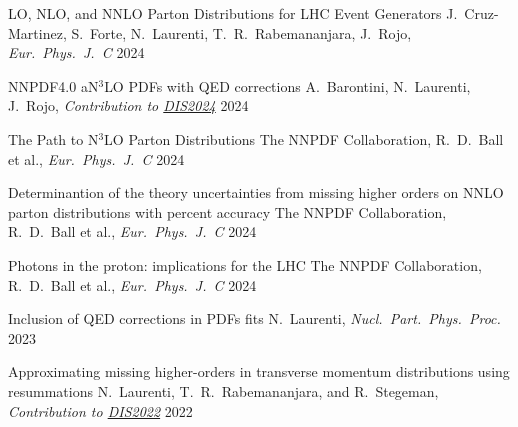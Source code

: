 
\begin{cvhonors}


    \cvhonor
    {LO, NLO, and NNLO Parton Distributions for LHC Event Generators} %
    {J.~Cruz-Martinez, S.~Forte, N.~Laurenti, T.~R.~Rabemananjara, J.~Rojo, \emph{Eur.\ Phys.\ J.\ C}} %
    {\vspace{0.35cm}\href{https://inspirehep.net/literature/2800507}{}}
    {\vspace{0.35cm}2024}

    \cvhonor
    {NNPDF4.0 aN$^3$LO PDFs with QED corrections} %
    {A.~Barontini, N.~Laurenti, J.~Rojo, \emph{Contribution to \href{https://inspirehep.net/conferences/2667502?ui-citation-summary=true}{DIS2024}}} %
    {\href{https://inspirehep.net/literature/2794583}{}}
    {2024}
    
    \cvhonor
    {The Path to N$^3$LO Parton Distributions} %
    {The NNPDF Collaboration, R.~D.~Ball et al., \emph{Eur.\ Phys.\ J.\ C}} %
    {\href{https://inspirehep.net/literature/2762925}{}}
    {2024}
    
    \cvhonor
    {Determinantion of the theory uncertainties from missing higher orders on NNLO parton distributions with percent accuracy} %
    {The NNPDF Collaboration, R.~D.~Ball et al., \emph{Eur.\ Phys.\ J.\ C}} %
    {\vspace{0.35cm}\href{https://inspirehep.net/literature/2749502}{}}
    {\vspace{0.35cm}2024}
    
    \cvhonor
    {Photons in the proton: implications for the LHC} %
    {The NNPDF Collaboration, R.~D.~Ball et al., \emph{Eur.\ Phys.\ J.\ C}} %
    {\href{https://inspirehep.net/literature/2747770}{}}
    {2024}

    \cvhonor
    {Inclusion of QED corrections in PDFs ﬁts}
    {N.~Laurenti, \textit{Nucl.\ Part.\ Phys.\ Proc.}}
    {\href{https://doi.org/10.1016/j.nuclphysbps.2023.11.013}{}}
    {2023}
    
    \cvhonor
    {Approximating missing higher-orders in transverse momentum distributions using resummations}
    {N.~Laurenti, T.~R.~Rabemananjara, and R.~Stegeman, \emph{Contribution to \href{https://inspirehep.net/conferences/1914506?ui-citation-summary=true}{DIS2022}}}
    {\vspace{0.35cm}\href{https://inspirehep.net/literature/2122473}{}}
    {\vspace{0.35cm}2022}

\end{cvhonors}